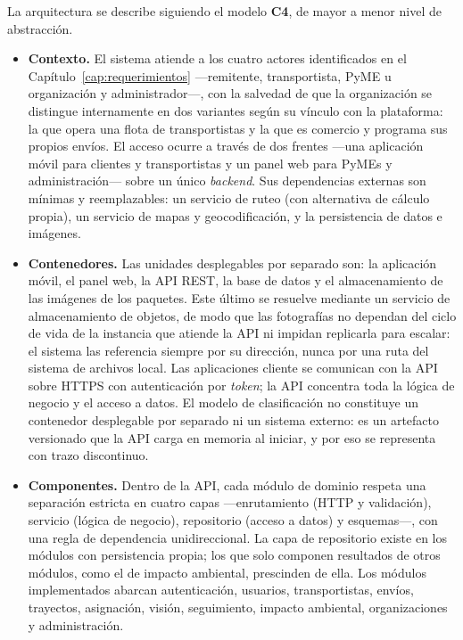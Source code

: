 {La arquitectura se describe siguiendo el modelo \textbf{C4}, de mayor a menor nivel de abstracción.

\begin{itemize}[leftmargin=2em]
    \item \textbf{Contexto.} El sistema atiende a los cuatro actores identificados en el Capítulo~\ref{cap:requerimientos} —remitente, transportista, PyME u organización y administrador—, con la salvedad de que la organización se distingue internamente en dos variantes según su vínculo con la plataforma: la que opera una flota de transportistas y la que es comercio y programa sus propios envíos. El acceso ocurre a través de dos frentes —una aplicación móvil para clientes y transportistas y un panel web para PyMEs y administración— sobre un único \emph{backend}. Sus dependencias externas son mínimas y reemplazables: un servicio de ruteo (con alternativa de cálculo propia), un servicio de mapas y geocodificación, y la persistencia de datos e imágenes.
    \item \textbf{Contenedores.} Las unidades desplegables por separado son: la aplicación móvil, el panel web, la API REST, la base de datos y el almacenamiento de las imágenes de los paquetes. Este último se resuelve mediante un servicio de almacenamiento de objetos, de modo que las fotografías no dependan del ciclo de vida de la instancia que atiende la API ni impidan replicarla para escalar: el sistema las referencia siempre por su dirección, nunca por una ruta del sistema de archivos local. Las aplicaciones cliente se comunican con la API sobre HTTPS con autenticación por \emph{token}; la API concentra toda la lógica de negocio y el acceso a datos. El modelo de clasificación no constituye un contenedor desplegable por separado ni un sistema externo: es un artefacto versionado que la API carga en memoria al iniciar, y por eso se representa con trazo discontinuo.
    \item \textbf{Componentes.} Dentro de la API, cada módulo de dominio respeta una separación estricta en cuatro capas —enrutamiento (HTTP y validación), servicio (lógica de negocio), repositorio (acceso a datos) y esquemas—, con una regla de dependencia unidireccional. La capa de repositorio existe en los módulos con persistencia propia; los que solo componen resultados de otros módulos, como el de impacto ambiental, prescinden de ella. Los módulos implementados abarcan autenticación, usuarios, transportistas, envíos, trayectos, asignación, visión, seguimiento, impacto ambiental, organizaciones y administración.
\end{itemize}

}
